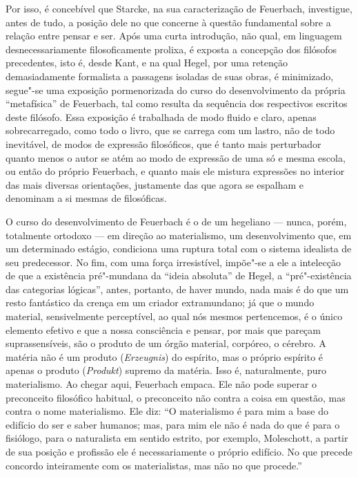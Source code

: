 Por isso, é concebível que Starcke, na sua caracterização
de Feuerbach,
investigue, antes de tudo, a posição dele no que concerne à questão
fundamental sobre a relação entre pensar e ser. Após uma curta
introdução, não qual, em linguagem desnecessariamente filosoficamente
prolixa, é exposta a concepção dos filósofos precedentes, isto é,
desde Kant,
e na qual
Hegel,
por uma retenção demasiadamente formalista a passagens isoladas de suas
obras, é minimizado, segue"-se uma exposição pormenorizada do curso do
desenvolvimento da própria ``metafísica''
de Feuerbach,
tal como resulta da sequência dos respectivos escritos deste filósofo.
Essa exposição é trabalhada de modo fluido e claro, apenas
sobrecarregado, como todo o livro, que se carrega com um lastro, não de
todo inevitável, de modos de expressão filosóficos, que é tanto mais
perturbador quanto menos o autor se atém ao modo de expressão de uma só
e mesma escola, ou então do
próprio Feuerbach,
e quanto mais ele mistura expressões no interior das mais diversas
orientações, justamente das que agora se espalham e denominam a si
mesmas de filosóficas.

O curso do desenvolvimento
de Feuerbach é
o de um hegeliano --- nunca, porém, totalmente ortodoxo --- em direção ao
materialismo, um desenvolvimento que, em um determinado estágio,
condiciona uma ruptura total com o sistema idealista de seu predecessor.
No fim, com uma força irresistível, impõe"-se a ele a intelecção de que a
existência pré"-mundana da ``ideia absoluta''
de Hegel,
a ``pré"-existência das categorias lógicas'', antes, portanto, de haver
mundo, nada mais é do que um resto fantástico da crença em um criador
extramundano; já que o mundo material, sensivelmente perceptível, ao
qual nós mesmos pertencemos, é o único elemento efetivo e que a nossa
consciência e pensar, por mais que pareçam suprassensíveis, são o
produto de um órgão material, corpóreo, o cérebro. A matéria não é um
produto (\emph{Erzeugnis}) do espírito, mas o próprio espírito é apenas
o produto (\emph{Produkt}) supremo da matéria. Isso é, naturalmente,
puro materialismo. Ao chegar aqui, Feuerbach empaca. Ele não pode
superar o preconceito filosófico habitual, o preconceito não contra a
coisa em questão, mas contra o nome materialismo. Ele diz: ``O
materialismo é para mim a base do edifício do ser e saber humanos; mas,
para mim ele não é nada do que é para o fisiólogo, para o naturalista em
sentido estrito, por exemplo,
Moleschott,
a partir de sua posição e profissão ele é necessariamente o próprio
edifício. No que precede concordo inteiramente com os materialistas, mas
não no que procede.''

